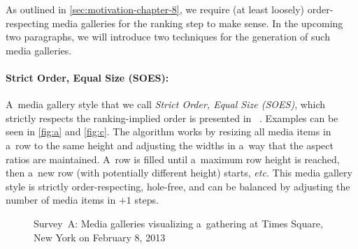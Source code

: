 As outlined in \autoref{sec:motivation-chapter-8},
we require (at least loosely) order-respecting media galleries
for the ranking step to make sense.
In the upcoming two paragraphs, we will introduce two techniques
for the generation of such media galleries.

\paragraph{Strict Order, Equal Size (SOES):}

A~media gallery style that we call \emph{Strict Order, Equal Size (SOES)},
which strictly respects the ranking-implied order is presented in~%
\cite{chedeau2012googleplus}.
Examples can be seen in \autoref{fig:a} and \autoref{fig:c}.
The algorithm works by resizing all media items in a~row to the same height
and adjusting the widths in a~way that the aspect ratios are maintained.
A~row is filled until a~maximum row height is reached,
then a~new row (with potentially different height) starts, \emph{etc.}
This media gallery style is strictly order-respecting, hole-free,
and can be balanced by adjusting the number
of media items in $+1$ steps.

\begin{figure}[!ht]
  \centering
  \caption[Survey~A: Media galleries visualizing a~gathering at Times Square]{Survey~A: Media galleries visualizing a~gathering at Times Square, New York on February 8, 2013}
  \label{fig:media-gallery1}
\end{figure}

